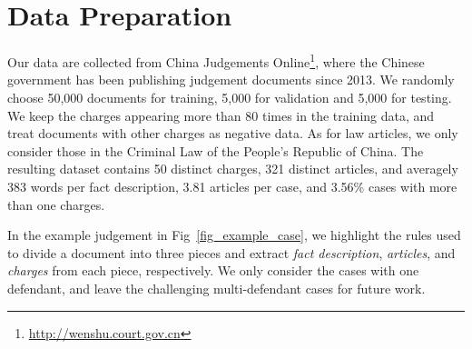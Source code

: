 \section{Data Preparation} 
Our data are collected from China Judgements Online\footnote{\url{http://wenshu.court.gov.cn}}, where the Chinese government has been publishing judgement documents since 2013.
We randomly choose 50,000 documents for training, 5,000 for validation and 5,000 for testing. We keep the charges appearing more than 80 times in the training data, and treat documents with other charges as negative data. As for law articles, we only consider those in the Criminal Law of the People's Republic of China. The resulting dataset contains 50 distinct charges, 321 distinct articles, and  averagely  383 words per fact description, 3.81 articles per case, and 3.56\% cases with more than one charges.

In the example judgement in Fig~\ref{fig_example_case}, we highlight the rules used to  
divide a document into three pieces %
and extract \textit{fact description}, \textit{articles}, and \textit{charges} from each piece, respectively.
We only consider the cases with one defendant, and leave the challenging multi-defendant cases for future work.





